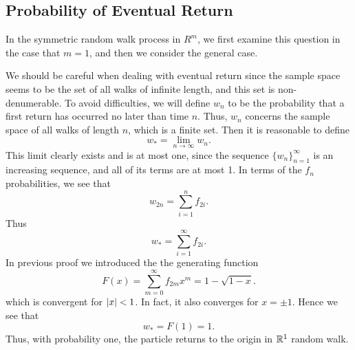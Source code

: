 \subsection{Probability of Eventual Return}
In the symmetric random walk process in $R^m$, we first examine this question in the case that $m = 1$, and then we consider the general case.

We should be careful when dealing with eventual return since the sample space seems to be the set of all walks of infinite length, and this set is non-denumerable. To avoid difficulties, we will define $w_n$ to be the probability that a first return has occurred no later than time $n$. Thus,
$w_n$ concerns the sample space of all walks of length $n$, which is a finite set. Then it is reasonable to define 
\begin{equation*}
    w_{*}=\lim _{n \rightarrow \infty} w_{n}.
\end{equation*}
This limit clearly exists and is at most one, since the sequence $\{w_n\}_{n=1}^\infty$ is an increasing sequence, and all of its terms are at most 1. In terms of the $f_n$ probabilities, we see that
\begin{equation*}
    w_{2 n}=\sum_{i=1}^{n} f_{2 i}.
\end{equation*}
Thus 
\begin{equation*}
    w_{*}=\sum_{i=1}^{\infty} f_{2 i}.
\end{equation*}
In previous proof we introduced the the generating function
\begin{equation*}
    F(x)=\sum_{m=0}^{\infty} f_{2 m} x^{m} = 1-\sqrt{1-x}.
\end{equation*}
which is convergent for $\left\vert x \right\vert < 1$. In fact, it also converges for $x = \pm 1$. Hence we see that 
\begin{equation*}
    w_{*}=F(1)=1.
\end{equation*}
Thus, with probability one, the particle returns to the origin in $\mathbb{R}^1$ random walk.

